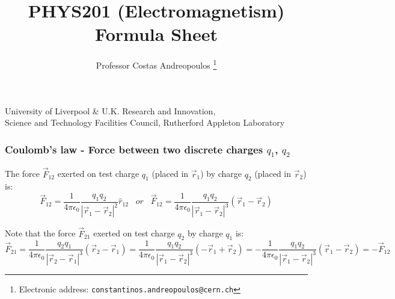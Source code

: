 \documentclass[english,11pt]{article}
\begin{document}
\title{
  {\bf PHYS201 (Electromagnetism)}\\
  Formula Sheet
}

\author{
  Professor Costas Andreopoulos
  \thanks {
    Electronic address: \texttt{constantinos.andreopoulos@cern.ch}
  }
}

\affil
{
  University of Liverpool \& U.K. Research and Innovation, \\
  Science and Technology Facilities Council, Rutherford Appleton Laboratory
}

\date{}

\maketitle

\begin{abstract}
\end{abstract}

\subsubsection*{\bf Coulomb's law - Force between two discrete charges $q_1$, $q_2$}

  \begin{itemize}
  {\small
     \item The force $\vec{F}_{12}$ exerted on test charge $q_1$
           (placed in $\vec{r}_{1}$) by charge $q_2$ (placed in $\vec{r}_{2}$) is:
     \begin{equation*}
       \vec{F}_{12} = \frac{1}{4\pi\epsilon_0} \frac{q_1 q_2}{|\vec{r}_{1}-\vec{r}_{2}|^{2}} \hat{r}_{12}
       \;\;\;
       or
       \;\;\;
       \vec{F}_{12} = \frac{1}{4\pi\epsilon_0} \frac{q_1 q_2}{|\vec{r}_{1}-\vec{r}_{2}|^{3}} (\vec{r}_{1}-\vec{r}_{2})
     \end{equation*}
     \item Note that the force $\vec{F}_{21}$ exerted on test charge $q_2$ by charge $q_1$ is:
     \begin{equation*}
       \vec{F}_{21} =
          \frac{1}{4\pi\epsilon_0} \frac{q_2 q_1}{|\vec{r}_{2}-\vec{r}_{1}|^{3}} (\vec{r}_{2}-\vec{r}_{1}) =
          \frac{1}{4\pi\epsilon_0} \frac{q_1 q_2}{|\vec{r}_{1}-\vec{r}_{2}|^{3}} (-\vec{r}_{1}+\vec{r}_{2}) =
        - \frac{1}{4\pi\epsilon_0} \frac{q_1 q_2}{|\vec{r}_{1}-\vec{r}_{2}|^{3}} (\vec{r}_{1}-\vec{r}_{2}) =
        - \vec{F}_{12}
    \end{equation*}
  }
  \end{itemize}
\end{document}
